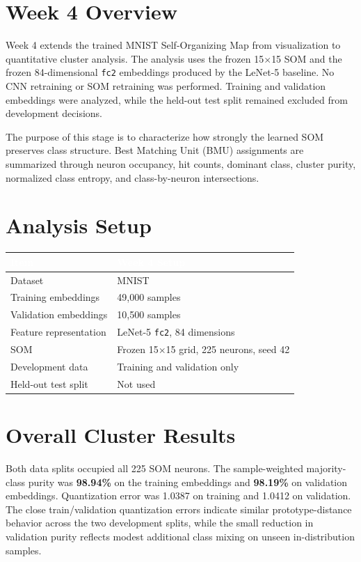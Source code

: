 \documentclass[11pt]{article}
\begin{document}
\setcounter{page}{2}

\section{Week 4 Overview}
Week 4 extends the trained MNIST Self-Organizing Map from visualization to quantitative cluster analysis. The analysis uses the frozen 15$\times$15 SOM and the frozen 84-dimensional \texttt{fc2} embeddings produced by the LeNet-5 baseline. No CNN retraining or SOM retraining was performed. Training and validation embeddings were analyzed, while the held-out test split remained excluded from development decisions.

The purpose of this stage is to characterize how strongly the learned SOM preserves class structure. Best Matching Unit (BMU) assignments are summarized through neuron occupancy, hit counts, dominant class, cluster purity, normalized class entropy, and class-by-neuron intersections.

\section{Analysis Setup}
\begin{table}[H]
\centering
\begin{tabular}{|p{}|p{}|}
\hline
\rowcolor{TableHeader}
\textcolor{white}{\textbf{Item}} & \textcolor{white}{\textbf{Week 4 Setup}} \\
\hline
Dataset & MNIST \\
\hline
Training embeddings & 49,000 samples \\
\hline
Validation embeddings & 10,500 samples \\
\hline
Feature representation & LeNet-5 \texttt{fc2}, 84 dimensions \\
\hline
SOM & Frozen 15$\times$15 grid, 225 neurons, seed 42 \\
\hline
Development data & Training and validation only \\
\hline
Held-out test split & Not used \\
\hline
\end{tabular}
\end{table}

\section{Overall Cluster Results}
Both data splits occupied all 225 SOM neurons. The sample-weighted majority-class purity was \textbf{98.94\%} on the training embeddings and \textbf{98.19\%} on validation embeddings. Quantization error was 1.0387 on training and 1.0412 on validation. The close train/validation quantization errors indicate similar prototype-distance behavior across the two development splits, while the small reduction in validation purity reflects modest additional class mixing on unseen in-distribution samples.
\end{document}
